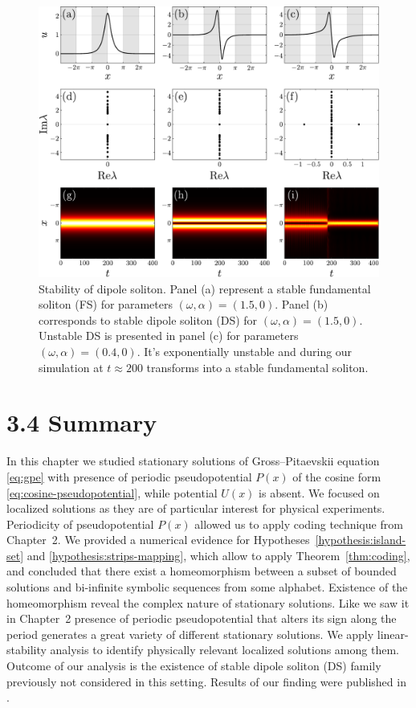 \begin{figure}[h]
\centering
	\includegraphics[scale = 1]{pic/dipole soliton stability}
	\caption{
		Stability of dipole soliton.
		Panel (a) represent a stable fundamental soliton (FS) for parameters $(\omega, \alpha) = (1.5, 0)$.
		Panel (b) corresponds to stable dipole soliton (DS) for $(\omega, \alpha) = (1.5, 0)$.
		Unstable DS is presented in panel (c) for parameters $(\omega, \alpha) = (0.4, 0)$.
		It's exponentially unstable and  during our simulation at $t \approx 200$ transforms into a stable fundamental soliton.
	}
\label{fig:stability-dipole-soliton}
\end{figure}

\section*{3.4 Summary}

In this chapter we studied stationary solutions of Gross--Pitaevskii equation \eqref{eq:gpe} with presence of periodic pseudopotential $P(x)$ of the cosine form \eqref{eq:cosine-pseudopotential}, while potential $U(x)$ is absent.
We focused on localized solutions as they are of particular interest for physical experiments.
Periodicity of pseudopotential $P(x)$ allowed us to apply coding technique from Chapter~2. %
We provided a numerical evidence for Hypotheses~\ref{hypothesis:island-set} and \ref{hypothesis:strips-mapping}, which allow to apply Theorem~\ref{thm:coding}, and concluded that there exist a homeomorphism between a subset of bounded solutions and bi-infinite symbolic sequences from some alphabet.
Existence of the homeomorphism reveal the complex nature of stationary solutions. 
Like we saw it in Chapter~2 presence of periodic pseudopotential that alters its sign along the period generates a great variety of different stationary solutions.
We apply linear-stability analysis to identify physically relevant localized solutions among them.
Outcome of our analysis is the existence of stable dipole soliton (DS) family previously not considered in this setting.
Results of our finding were published in \cite{LebedevAlfimovMalomed}.
